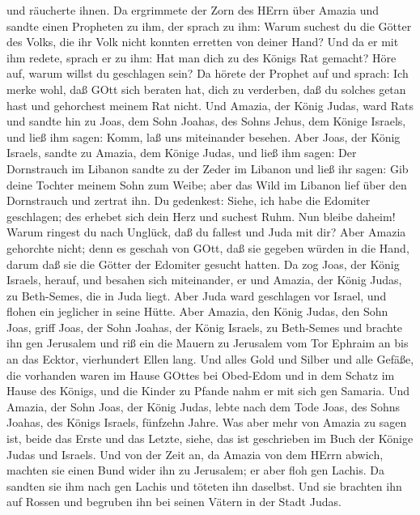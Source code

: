 und räucherte ihnen.  Da ergrimmete der Zorn des HErrn über
Amazia und sandte einen Propheten zu ihm, der sprach zu ihm: Warum
suchest du die Götter des Volks, die ihr Volk nicht konnten erretten von
deiner Hand?  Und da er mit ihm redete, sprach er zu ihm:
Hat man dich zu des Königs Rat gemacht? Höre auf, warum willst du
geschlagen sein? Da hörete der Prophet auf und sprach: Ich merke wohl,
daß GOtt sich beraten hat, dich zu verderben, daß du solches getan hast
und gehorchest meinem Rat nicht.  Und Amazia, der König
Judas, ward Rats und sandte hin zu Joas, dem Sohn Joahas, des Sohns
Jehus, dem Könige Israels, und ließ ihm sagen: Komm, laß uns miteinander
besehen.  Aber Joas, der König Israels, sandte zu Amazia,
dem Könige Judas, und ließ ihm sagen: Der Dornstrauch im Libanon sandte
zu der Zeder im Libanon und ließ ihr sagen: Gib deine Tochter meinem
Sohn zum Weibe; aber das Wild im Libanon lief über den Dornstrauch und
zertrat ihn.  Du gedenkest: Siehe, ich habe die Edomiter
geschlagen; des erhebet sich dein Herz und suchest Ruhm. Nun bleibe
daheim! Warum ringest du nach Unglück, daß du fallest und Juda mit dir?
 Aber Amazia gehorchte nicht; denn es geschah von GOtt, daß
sie gegeben würden in die Hand, darum daß sie die Götter der Edomiter
gesucht hatten.  Da zog Joas, der König Israels, herauf,
und besahen sich miteinander, er und Amazia, der König Judas, zu
Beth-Semes, die in Juda liegt.  Aber Juda ward geschlagen
vor Israel, und flohen ein jeglicher in seine Hütte.  Aber
Amazia, den König Judas, den Sohn Joas, griff Joas, der Sohn Joahas, der
König Israels, zu Beth-Semes und brachte ihn gen Jerusalem und riß ein
die Mauern zu Jerusalem vom Tor Ephraim an bis an das Ecktor,
vierhundert Ellen lang.  Und alles Gold und Silber und alle
Gefäße, die vorhanden waren im Hause GOttes bei Obed-Edom und in dem
Schatz im Hause des Königs, und die Kinder zu Pfande nahm er mit sich
gen Samaria.  Und Amazia, der Sohn Joas, der König Judas,
lebte nach dem Tode Joas, des Sohns Joahas, des Königs Israels, fünfzehn
Jahre.  Was aber mehr von Amazia zu sagen ist, beide das
Erste und das Letzte, siehe, das ist geschrieben im Buch der Könige
Judas und Israels.  Und von der Zeit an, da Amazia von dem
HErrn abwich, machten sie einen Bund wider ihn zu Jerusalem; er aber
floh gen Lachis. Da sandten sie ihm nach gen Lachis und töteten ihn
daselbst.  Und sie brachten ihn auf Rossen und begruben ihn
bei seinen Vätern in der Stadt Judas.

